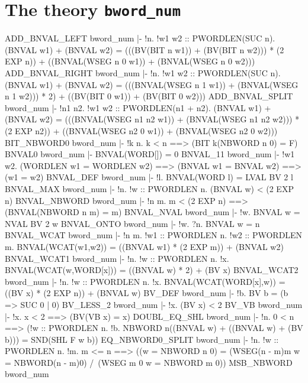\section{The theory {\tt bword\_num}}
\THEOREM ADD\_BNVAL\_LEFT bword\_num
|- !n.
    !w1 w2 :: PWORDLEN(SUC n).
     (BNVAL w1) + (BNVAL w2) =
     (((BV(BIT n w1)) + (BV(BIT n w2))) * (2 EXP n)) +
     ((BNVAL(WSEG n 0 w1)) + (BNVAL(WSEG n 0 w2)))
\ENDTHEOREM
\THEOREM ADD\_BNVAL\_RIGHT bword\_num
|- !n.
    !w1 w2 :: PWORDLEN(SUC n).
     (BNVAL w1) + (BNVAL w2) =
     (((BNVAL(WSEG n 1 w1)) + (BNVAL(WSEG n 1 w2))) * 2) +
     ((BV(BIT 0 w1)) + (BV(BIT 0 w2)))
\ENDTHEOREM
\THEOREM ADD\_BNVAL\_SPLIT bword\_num
|- !n1 n2.
    !w1 w2 :: PWORDLEN(n1 + n2).
     (BNVAL w1) + (BNVAL w2) =
     (((BNVAL(WSEG n1 n2 w1)) + (BNVAL(WSEG n1 n2 w2))) * (2 EXP n2)) +
     ((BNVAL(WSEG n2 0 w1)) + (BNVAL(WSEG n2 0 w2)))
\ENDTHEOREM
\THEOREM BIT\_NBWORD0 bword\_num
|- !k n. k < n ==> (BIT k(NBWORD n 0) = F)
\ENDTHEOREM
\THEOREM BNVAL0 bword\_num
|- BNVAL(WORD[]) = 0
\ENDTHEOREM
\THEOREM BNVAL\_11 bword\_num
|- !w1 w2.
    (WORDLEN w1 = WORDLEN w2) ==> (BNVAL w1 = BNVAL w2) ==> (w1 = w2)
\ENDTHEOREM
\THEOREM BNVAL\_DEF bword\_num
|- !l. BNVAL(WORD l) = LVAL BV 2 l
\ENDTHEOREM
\THEOREM BNVAL\_MAX bword\_num
|- !n. !w :: PWORDLEN n. (BNVAL w) < (2 EXP n)
\ENDTHEOREM
\THEOREM BNVAL\_NBWORD bword\_num
|- !n m. m < (2 EXP n) ==> (BNVAL(NBWORD n m) = m)
\ENDTHEOREM
\THEOREM BNVAL\_NVAL bword\_num
|- !w. BNVAL w = NVAL BV 2 w
\ENDTHEOREM
\THEOREM BNVAL\_ONTO bword\_num
|- !w. ?n. BNVAL w = n
\ENDTHEOREM
\THEOREM BNVAL\_WCAT bword\_num
|- !n m.
    !w1 :: PWORDLEN n.
     !w2 :: PWORDLEN m.
      BNVAL(WCAT(w1,w2)) = ((BNVAL w1) * (2 EXP m)) + (BNVAL w2)
\ENDTHEOREM
\THEOREM BNVAL\_WCAT1 bword\_num
|- !n.
    !w :: PWORDLEN n.
     !x. BNVAL(WCAT(w,WORD[x])) = ((BNVAL w) * 2) + (BV x)
\ENDTHEOREM
\THEOREM BNVAL\_WCAT2 bword\_num
|- !n.
    !w :: PWORDLEN n.
     !x. BNVAL(WCAT(WORD[x],w)) = ((BV x) * (2 EXP n)) + (BNVAL w)
\ENDTHEOREM
\THEOREM BV\_DEF bword\_num
|- !b. BV b = (b => SUC 0 | 0)
\ENDTHEOREM
\THEOREM BV\_LESS\_2 bword\_num
|- !x. (BV x) < 2
\ENDTHEOREM
\THEOREM BV\_VB bword\_num
|- !x. x < 2 ==> (BV(VB x) = x)
\ENDTHEOREM
\THEOREM DOUBL\_EQ\_SHL bword\_num
|- !n.
    0 < n ==>
    (!w :: PWORDLEN n.
      !b. NBWORD n((BNVAL w) + ((BNVAL w) + (BV b))) = SND(SHL F w b))
\ENDTHEOREM
\THEOREM EQ\_NBWORD0\_SPLIT bword\_num
|- !n.
    !w :: PWORDLEN n.
     !m.
      m <= n ==>
      ((w = NBWORD n 0) =
       (WSEG(n - m)m w = NBWORD(n - m)0) /\ (WSEG m 0 w = NBWORD m 0))
\ENDTHEOREM
\THEOREM MSB\_NBWORD bword\_num
